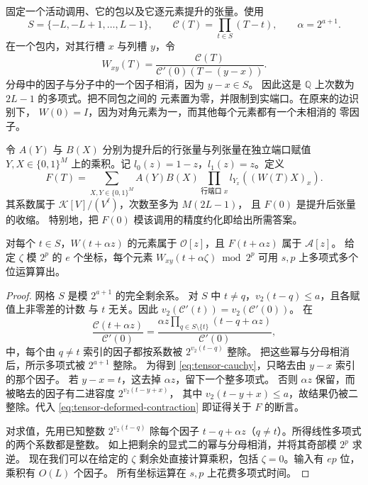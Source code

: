 固定一个活动调用、它的包以及它逐元素提升的张量。使用
\[
 S=\{-L,-L+1,\ldots,L-1\},\qquad
 \mathcal C(T)=\prod_{t\in S}(T-t),\qquad \alpha=2^{a+1}.
\]
在一个包内，对其行槽 $x$ 与列槽 $y$，令
\begin{equation}\label{eq:tensor-cauchy}
 W_{xy}(T)=\frac{\mathcal C(T)}
                 {\mathcal C'(0)(T-(y-x))}.
\end{equation}
分母中的因子与分子中的一个因子相消，因为 $y-x\in S$。
因此这是 $\mathbb Q$ 上次数为 $2L-1$ 的多项式。把不同包之间的
元素置为零，并限制到实端口。在原来的边识别下，
$W(0)=I$，因为对角元素为一，而其他每个元素都有一个未相消的
零因子。

令 $A(Y)$ 与 $B(X)$ 分别为提升后的行张量与列张量在独立端口赋值
$Y,X\in\{0,1\}^M$ 上的乘积。记 $l_0(z)=1-z$，$l_1(z)=z$。定义
\begin{equation}\label{eq:tensor-deformed-contraction}
 F(T)=\sum_{X,Y\in\{0,1\}^M} A(Y)B(X)
                 \prod_{\text{行端口 }x}l_{Y_x}((W(T)X)_x).
\end{equation}
其系数属于 $\mathcal K[V]/(V^\ell)$，次数至多为 $M(2L-1)$，
且 $F(0)$ 是提升后张量的收缩。
特别地，把 $F(0)$ 模该调用的精度约化即给出所需答案。

\begin{lemma}\label{lem:tensor-integrality}
对每个 $t\in S$，$W(t+\alpha z)$ 的元素属于 $\mathcal O[z]$，且
$F(t+\alpha z)$ 属于 $\mathcal A[z]$。
给定 $\zeta$ 模 $2^p$ 的 $e$ 个坐标，每个元素
$W_{xy}(t+\alpha\zeta)\bmod 2^p$ 可用 $s,p$ 上多项式多个位运算算出。
\end{lemma}
\begin{proof}
网格 $S$ 是模 $2^{a+1}$ 的完全剩余系。
对 $S$ 中 $t\ne q$，$v_2(t-q)\le a$，且各赋值上非零差的计数
与 $t$ 无关。因此 $v_2(\mathcal C'(t))=v_2(\mathcal C'(0))$。
在
\[
 \frac{\mathcal C(t+\alpha z)}{\mathcal C'(0)}
  =\frac{\alpha z\prod_{q\in S\setminus\{t\}}
                        (t-q+\alpha z)}{\mathcal C'(0)},
\]
中，每个由 $q\ne t$ 索引的因子都按系数被 $2^{v_2(t-q)}$ 整除。
把这些幂与分母相消后，所示多项式被 $2^{a+1}$ 整除。
为得到 \eqref{eq:tensor-cauchy}，只略去由 $y-x$ 索引的那个因子。
若 $y-x=t$，这去掉 $\alpha z$，留下一个整多项式。
否则 $\alpha z$ 保留，而被略去的因子有二进容度 $2^{v_2(t-y+x)}$，
其中 $v_2(t-y+x)\le a$，故结果仍被二整除。代入
\eqref{eq:tensor-deformed-contraction} 即证得关于 $F$ 的断言。

对求值，先用已知整数 $2^{v_2(t-q)}$ 除每个因子
$t-q+\alpha z$（$q\ne t$）。所得线性多项式的两个系数都是整数。
如上把剩余的显式二的幂与分母相消，并将其奇部模 $2^p$ 求逆。
现在我们可以在给定的 $\zeta$ 剩余处直接计算乘积，包括
$\zeta=0$。输入有 $ep$ 位，乘积有 $O(L)$ 个因子。
所有坐标运算在 $s,p$ 上花费多项式时间。
\end{proof}

